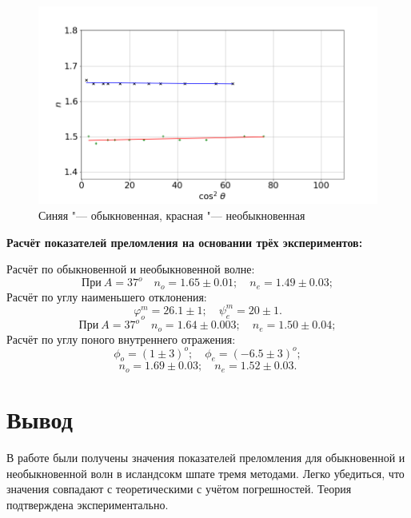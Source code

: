 \documentclass[10pt, a4paper]{article}
\begin{document}
	\begin{figure}[H]
	\includegraphics[width = 1.0\linewidth]{g1.png}
	\caption{Синяя "--- обыкновенная, красная "--- необыкновенная}
\end{figure}
\textbf{Расчёт показателей преломления на основании трёх экспериментов:}

Расчёт по обыкновенной и необыкновенной волне:
\[
	\text{При} \ A = 37^o \quad n_o = 1.65 \pm 0.01; \quad n_e = 1.49 \pm 0.03;
\] 
Расчёт по углу наименьшего отклонения:
\[
\varphi_o^m = 26.1 \pm 1; \quad \psi_e^m = 20 \pm 1.
\]
\[
	\text{При}\ A = 37^o \quad n_o = 1.64 \pm 0.003; \quad n_e = 1.50 \pm 0.04;
\]
Расчёт по углу поного внутреннего отражения:
\[
	\phi_o = (1 \pm 3)^o; \quad \phi_e = (-6.5 \pm 3)^o;
\]
\[
	n_o = 1.69 \pm 0.03; \quad n_e = 1.52 \pm 0.03.
\]
\section*{Вывод}
В работе были получены значения показателей преломления для обыкновенной и необыкновенной волн в исландсокм шпате тремя методами. Легко убедиться, что значения совпадают с теоретическими с учётом погрешностей. Теория подтверждена экспериментально.
\end{document}
